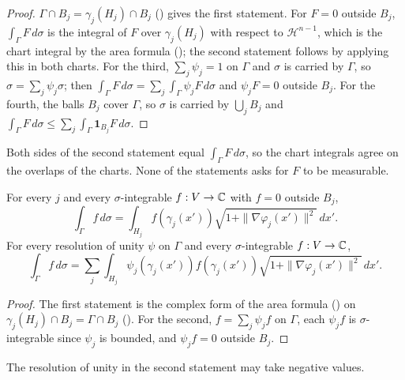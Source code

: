 \begin{proof}
\leanok
$\Gamma \cap B_j = \gamma_j(H_j) \cap B_j$ () gives the first
statement. For $F = 0$ outside $B_j$, $\int_\Gamma F \, d\sigma$ is the integral of $F$ over
$\gamma_j(H_j)$ with respect to $\mathcal H^{n-1}$, which is the chart integral by the area
formula (); the second statement follows by applying this in both
charts. For the third, $\sum_j \psi_j = 1$ on $\Gamma$ and $\sigma$ is carried by $\Gamma$, so
$\sigma = \sum_j \psi_j \sigma$; then
$\int_\Gamma F \, d\sigma = \sum_j \int_\Gamma \psi_j F \, d\sigma$ and $\psi_j F = 0$ outside
$B_j$. For the fourth, the balls $B_j$ cover $\Gamma$, so $\sigma$ is
carried by $\bigcup_j B_j$ and $\int_\Gamma F \, d\sigma \leq \sum_j \int_\Gamma \mathbf 1_{B_j} F
\, d\sigma$.
\end{proof}

Both sides of the second statement equal $\int_\Gamma F \, d\sigma$, so the chart integrals agree
on the overlaps of the charts. None of the statements asks for $F$ to be measurable.

\begin{theorem}
\label{thm:surface-measure-charts-complex}
\leanok
{}
For every $j$ and every $\sigma$-integrable $f : V \to \mathbb{C}$ with $f = 0$ outside $B_j$,
\[
  \int_\Gamma f \, d\sigma
  = \int_{H_j} f(\gamma_j(x')) \sqrt{1 + \|\nabla\varphi_j(x')\|^2} \, dx' .
\]
For every resolution of unity $\psi$ on $\Gamma$ and every $\sigma$-integrable $f : V \to \mathbb{C}$,
\[
  \int_\Gamma f \, d\sigma = \sum_j \int_{H_j} \psi_j(\gamma_j(x')) f(\gamma_j(x'))
  \sqrt{1 + \|\nabla\varphi_j(x')\|^2} \, dx' .
\]
\end{theorem}

\begin{proof}
\leanok
The first statement is the complex form of the area formula () on
$\gamma_j(H_j) \cap B_j = \Gamma \cap B_j$ (). For the second,
$f = \sum_j \psi_j f$ on $\Gamma$, each $\psi_j f$ is $\sigma$-integrable since $\psi_j$ is
bounded, and $\psi_j f = 0$ outside $B_j$.
\end{proof}

The resolution of unity in the second statement may take negative values.

